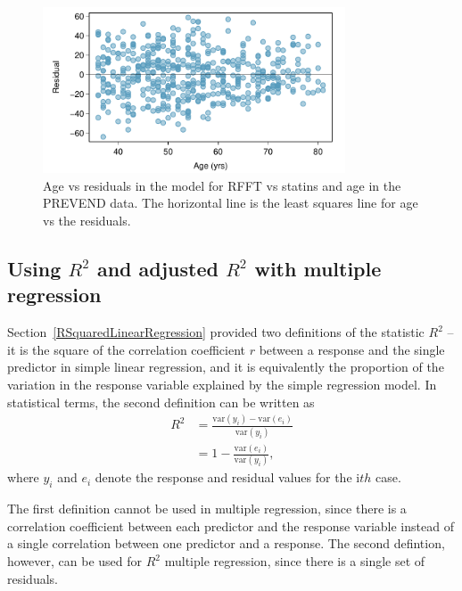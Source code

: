 \begin{figure}[h!]
	\centering
	\includegraphics[width=0.8\textwidth]
	{ch_multiple_linear_regression_oi_biostat/figures/prevendStatinAgeResidPlot/prevendStatinAgeResidPlot.pdf}
	\caption{Age vs residuals in the model for RFFT vs statins and age in the PREVEND data.  The horizontal line is the least squares line for age vs the residuals.}
	\label{prevendStatinAgeResidPlot}
\end{figure}


\subsection{Using $R^2$ and adjusted $R^2$ with multiple regression}


Section~\ref{RSquaredLinearRegression} provided two definitions of the statistic $R^2$ -- it is the square of the correlation coefficient $r$ between a response and the single predictor in simple linear regression, and it is equivalently the proportion of the variation in the response variable explained by the simple regression model.  In statistical terms, the second definition can be written as 
\begin{align*}
   R^2 &= \frac{\text{var}(y_i) - \text{var}(e_i)}
   {\text{var}(y_i)}\\
   &= 1 - \frac{\text{var}(e_i)}{\text{var}(y_i)},
   \label{RSquareDefinition}
\end{align*}
where $y_i$ and $e_i$ denote the response and residual values for the
i$th$ case.

The first definition cannot be used in multiple regression, since there is a correlation coefficient between each predictor and the response variable instead of a single correlation between one predictor and a response.  The second defintion, however, can be used for $R^2$ multiple regression, since there is a single set of residuals.

